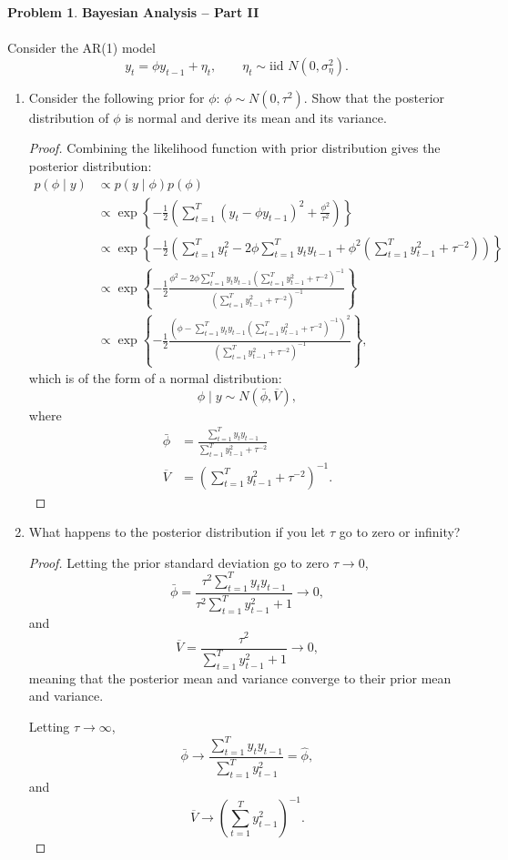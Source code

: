 \documentclass[oneside,reqno]{amsart}
\theoremstyle{definition}
\newtheorem{prob}{Problem}
\begin{document}
\begin{prob}
\textbf{Bayesian Analysis -- Part II} 
\\ \\
Consider the AR(1) model 
\[
	y_t = \phi y_{t-1} + \eta_t, \qquad \eta_t \sim \text{iid } N(0, \sigma_\eta^2).
\]
\end{prob}


\begin{enumerate}
\item
Consider the following prior for $\phi$: $\phi \sim N(0, \tau^2)$. Show that the posterior distribution of $\phi$ is normal and derive its mean and its variance.

\begin{proof}
Combining the likelihood function with prior distribution gives the posterior distribution:
\begin{align*}
	p(\phi \mid y) & \propto p(y \mid \phi) p(\phi) \\ 
	& \propto \exp\left\{- \frac{1}{2} \left( \sum_{t=1}^{T} (y_t - \phi y_{t-1} )^2  +\frac{\phi^2}{\tau^2} \right) \right\} \\
	&\propto \exp\left\{- \frac{1}{2}  \left( \sum_{t=1}^{T} y_t^2 - 2 \phi \sum_{t=1}^{T} y_t y_{t-1} + \phi^2 \left(\sum_{t=1}^{T} y_{t-1}^2 + \tau^{-2} \right) \right)\right\} \\
	& \propto \exp\left\{ - \frac{1}{2}\frac{\phi^2 - 2 \phi \sum_{t=1}^{T} y_t  y_{t-1} (\sum_{t=1}^{T}y_{t-1}^2 + \tau^{-2})^{-1}}{(\sum_{t=1}^{T} y_{t-1}^2 + \tau^{-2})^{-1}} \right\} \\
	& \propto \exp\left\{ - \frac{1}{2}\frac{(\phi - \sum_{t=1}^{T} y_t y_{t-1} (\sum_{t=1}^{T} y_{t-1}^2 + \tau^{-2})^{-1})^2}{(\sum_{t=1}^{T}  y_{t-1}^2 + \tau^{-2})^{-1}} \right\},
\end{align*}
which is of the form of a normal distribution: 
\[
	\phi \mid y\sim N(\bar \phi, \overline V),
\]
where 
\begin{align*}
	\bar \phi &=\frac{ \sum_{t=1}^{T} y_t y_{t-1}}{\sum_{t=1}^{T}y_{t-1}^2 + \tau^{-2}} \\
	\overline V &= \left(\sum_{t=1}^{T} y_{t-1}^2 + \tau^{-2} \right)^{-1}.
\end{align*}
\end{proof}


\item
What happens to the posterior distribution if you let $\tau$ go to zero or infinity?
 
\begin{proof}
Letting the prior standard deviation go to zero $\tau \to 0$, 
\[
	\bar \phi =\frac{\tau^2 \sum_{t=1}^{T} y_t y_{t-1}}{\tau^2 \sum_{t=1}^{T}y_{t-1}^2 + 1} \to 0,
\]
and 
\[
	\overline V = \frac{\tau^2}{\sum_{t=1}^{T} y_{t-1}^2 + 1} \to 0,
\]
meaning that the posterior mean and variance converge to their prior mean and variance. 
\par
Letting $\tau \to \infty$, 
\[
	\bar \phi \to \frac{\sum_{t=1}^T y_t y_{t-1}}{\sum_{t=1}^T y_{t-1}^2} 
	= \hat \phi,
\]
and 
\[
	\overline V \to  \left(\sum_{t=1}^{T} y_{t-1}^2 \right)^{-1}.
\]
\end{proof}



\end{enumerate}
\end{document}
